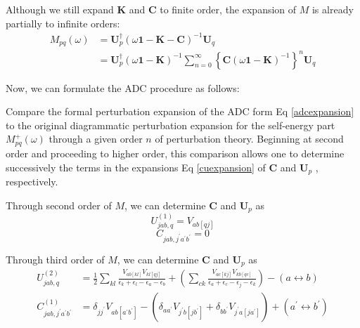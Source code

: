 Although we still expand $\boldsymbol{K}$ and $\boldsymbol{C}$ to finite order, the expansion of $M$ is already partially to infinite orders:
\begin{equation} \label{adcexpansion}
	\begin{aligned} M_{p q}(\omega) &=\boldsymbol{U}_{p}^{\dagger}(\omega \mathbf{1}-\boldsymbol{K}-\boldsymbol{C})^{-1} \boldsymbol{U}_{q} \\ &=\boldsymbol{U}_{p}^{\dagger}(\omega \mathbf{1}-\boldsymbol{K})^{-1} \sum_{n=0}^{\infty}\left\{\boldsymbol{C}(\omega \mathbf{1}-\boldsymbol{K})^{-1}\right\}^{n} \boldsymbol{U}_{q} \end{aligned}
\end{equation}

Now, we can formulate the ADC procedure as follows:

Compare the formal perturbation expansion of the ADC form Eq \ref{adcexpansion} to the original diagrammatic perturbation expansion for the self-energy part $M^{+}_{pq}(\omega)$ through a given order $n$ of perturbation theory.
Beginning at second order and proceeding to higher order, this comparison allows one to determine successively the terms in the expansions Eq \ref{cuexpansion} of $\boldsymbol{C}$ and $\boldsymbol{U}_p$ , respectively.

Through second order of $M$, we can determine $\boldsymbol{C}$ and $\boldsymbol{U}_p$ as
\begin{equation}
	U_{j a b, q}^{(1)}=V_{a b[q j]}
\end{equation}
\begin{equation}
	C_{j a b, j^{\prime} a^{\prime} b^{\prime}}=0
\end{equation}

Through third order of $M$, we can determine $\boldsymbol{C}$ and $\boldsymbol{U}_p$ as
\begin{equation}
	\begin{aligned} 
		U_{j a b, q}^{(2)}&= \frac{1}{2} \sum_{k l} \frac{V_{a b[k l]} V_{k l[q j]}}{\epsilon_{k}+\epsilon_{l}-\epsilon_{a}-\epsilon_{b}} +\left(\sum_{c k} \frac{V_{a c[k j]} V_{k b[q c]}}{\epsilon_{a}+\epsilon_{c}-\epsilon_{j}-\epsilon_{k}}\right)-(a \leftrightarrow b)
		\\
		C_{j a b, j^{\prime} a^{\prime} b^{\prime}}^{(1)}&=\delta_{j j^{\prime}} V_{a b\left[a^{\prime} b^{\prime}\right]}-\left(\delta_{a a^{\prime}} V_{j^{\prime} b\left[j b^{\prime}\right]}+\delta_{b b^{\prime}} V_{j^{\prime} a\left[j a^{\prime}\right]}\right)+(a^{\prime} \leftrightarrow b^{\prime})
	 \end{aligned}
\end{equation}

